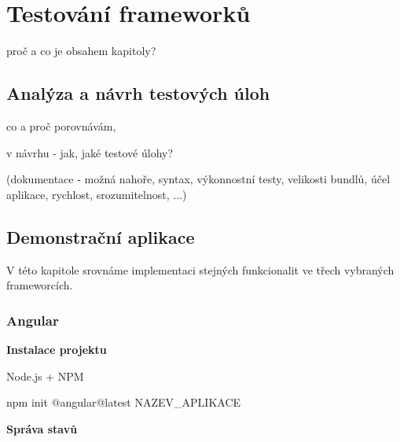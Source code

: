 \section{Testování frameworků}

\begin{citemize}
	\item proč a co je obsahem kapitoly?
\end{citemize}

\subsection{Analýza a návrh testových úloh}

\begin{citemize}
	\item co a proč porovnávám,
	\item v návrhu - jak, jaké testové úlohy?
	\item (dokumentace - možná nahoře, syntax, výkonnostní testy, velikosti bundlů, účel aplikace, rychlost, srozumitelnost, ...)
\end{citemize}

\subsection{Demonstrační aplikace}

V této kapitole srovnáme implementaci stejných funkcionalit ve třech vybraných frameworcích.

\subsubsection{Angular}

\begin{flushleft}
  \textbf{Instalace projektu}
\end{flushleft}

\begin{citemize}
	\item Node.js + NPM
  \item npm init @angular@latest NAZEV\_APLIKACE
  \item {}
  \item {}
\end{citemize}

\begin{flushleft}
  \textbf{Správa stavů}
\end{flushleft}

